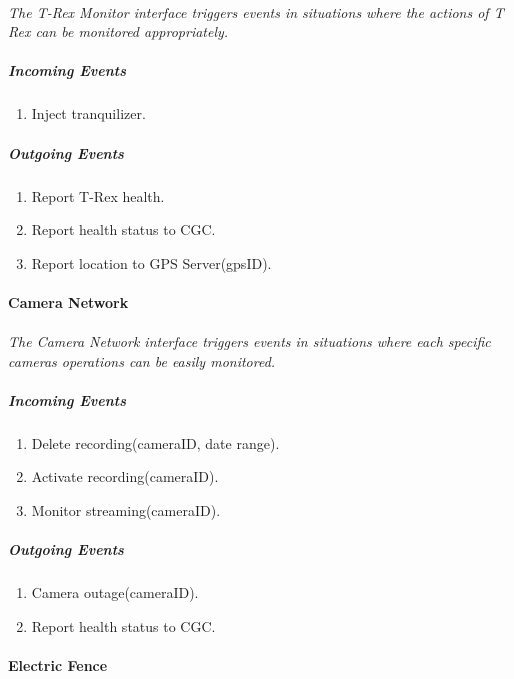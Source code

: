 \documentclass[12pt]{article}
\begin{document}
    \paragraph{}\textit{The T-Rex Monitor interface triggers events in situations where 
    the actions of T Rex can be monitored appropriately. }
        \subparagraph{Incoming Events}
        \begin{enumerate}
            \item Inject tranquilizer. 
        \end{enumerate}
                
        \subparagraph{Outgoing Events}
        \begin{enumerate}
            \item Report T-Rex health.
            \item Report health status to CGC.
            \item Report location to GPS Server(gpsID).
        \end{enumerate}

    \paragraph{Camera Network}
    \paragraph{}\textit{The Camera Network interface triggers events in situations 
    where each specific cameras operations can be easily monitored. }
        \subparagraph{Incoming Events}
        \begin{enumerate}
            \item Delete recording(cameraID, date range).
            \item Activate recording(cameraID).
            \item Monitor streaming(cameraID).
        \end{enumerate}
        
        \subparagraph{Outgoing Events}
        \begin{enumerate}
            \item Camera outage(cameraID).
            \item Report health status to CGC. 
        \end{enumerate}

    \paragraph{Electric Fence}
\end{document}
